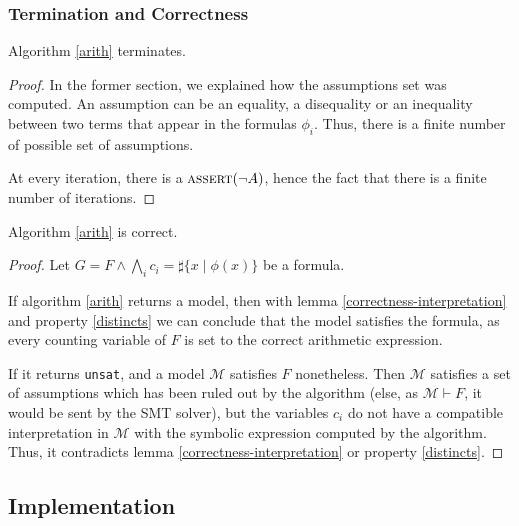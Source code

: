 \subsubsection{Termination and Correctness}

\begin{lemma}[Termination]

Algorithm \ref{arith} terminates.

\label{termination}

\end{lemma}

\begin{proof}
In the former section, we explained how the assumptions set was computed. An
assumption can be an equality, a disequality or an inequality between two terms
that appear in the formulas $\phi_i$. Thus, there is a finite number of possible
set of assumptions.

At every iteration, there is a $\text{\textsc{assert}}(\lnot A)$, hence the fact that there is
a finite number of iterations.
\end{proof}

\begin{lemma}[Correctness]

Algorithm \ref{arith} is correct.
\end{lemma}

\begin{proof}
Let $G = F \land \bigwedge\limits_{i} c_i = \sharp\{x\mid\phi(x)\}$ be a formula.

If algorithm \ref{arith} returns a model, then with lemma \ref{correctness-interpretation} and property
\ref{distincts} we can conclude that the model satisfies the formula, as every counting variable of
$F$ is set to the correct arithmetic expression.

If it returns \texttt{unsat}, and a model $\mathcal{M}$ satisfies $F$ nonetheless. Then $\mathcal{M}$
satisfies a set of assumptions which has been ruled out by the algorithm (else, as $\mathcal{M}
\vdash F$, it would be sent by the SMT solver), but the variables $c_i$ do not have a compatible
interpretation in $\mathcal{M}$ with the symbolic expression computed by the algorithm. Thus, it
contradicts lemma \ref{correctness-interpretation} or property \ref{distincts}.
\end{proof}

\subsection{Implementation}

